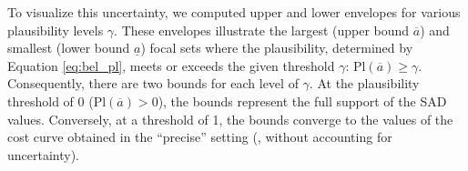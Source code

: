 To visualize this uncertainty, we computed upper and lower envelopes for various plausibility levels $\gamma$. These envelopes illustrate the largest (upper bound $\overline{a}$) and smallest (lower bound $\underline{a}$) focal sets where the plausibility, determined by Equation \eqref{eq:bel_pl}, meets or exceeds the given threshold $\gamma$: $\mathrm{Pl}(\overline{a}) \geqslant \gamma$. Consequently, there are two bounds for each level of $\gamma$.
At the plausibility threshold of 0 ($\mathrm{Pl}(\overline{a}) > 0$), the bounds represent the full support of the SAD values. Conversely, at a threshold of 1, the bounds converge to the values of the cost curve obtained in the ``precise'' setting (\ie, without accounting for uncertainty).

